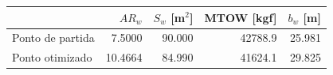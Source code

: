 \begin{tabular}{lrrrr}
\toprule
& $AR_w$ & $S_w$ [m$^2$] & MTOW [kgf] & $b_w$ [m] \\
\midrule
Ponto de partida & 7.5000 & 90.000 & 42788.9 & 25.981 \\
Ponto otimizado & 10.4664 & 84.990 & 41624.1 & 29.825 \\
\bottomrule
\end{tabular}